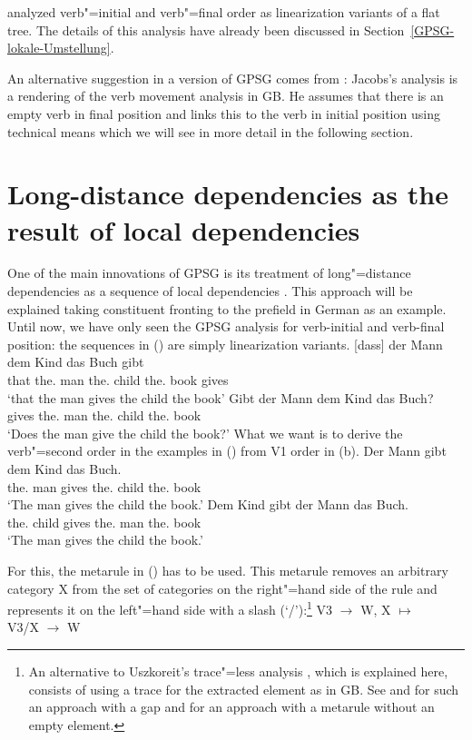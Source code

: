 \mbox{}\citet{Uszkoreit87a} analyzed verb"=initial and verb"=final order as linearization variants of a flat tree. The details of this analysis have already
been discussed in Section~\ref{GPSG-lokale-Umstellung}.

An alternative suggestion in a version of GPSG comes from \citet[]{Jacobs86a}: Jacobs's analysis is a rendering of the verb movement analysis in GB. He assumes that there
is an empty verb in final position and links this to the verb in initial position using technical
means which we will see in more detail in the following section.

\section{Long-distance dependencies as the result of local dependencies}
\label{Abschnitt-GPSG-Fernabhaengigkeiten}\label{sec-nld-gpsg}

One of the main innovations of GPSG is its treatment of long"=distance dependencies as a sequence of local dependencies \citep{Gazdar81a}.
This approach will be explained taking constituent fronting to the prefield in German as an
example. Until now, we have only seen the GPSG analysis for verb-initial and verb-final position: the
sequences in () are simply linearization variants.
\eal
\ex 
\gll {}[dass]         der        Mann dem        Kind das Buch gibt\\
     {}\spacebr{}that the.\NOM{} man  the.\DAT{} child the.\ACC{} book gives\\
\glt `that the man gives the child the book'
\ex 
\gll Gibt der Mann dem Kind das Buch?\\
	 gives the.\NOM{} man the.\DAT{} child the.\ACC{} book\\
\glt `Does the man give the child the book?'
\zl
What we want is to derive the verb"=second order in the examples in () from V1 order in (b).
\eal
\ex 
\gll Der Mann gibt dem Kind das Buch.\\
     the.\NOM{} man  gives the.\DAT{} child the.\ACC{} book\\
\glt `The man gives the child the book.'
\ex 
\gll Dem Kind gibt der Mann das Buch.\\
     the.\DAT{} child gives the.\NOM{} man the.\ACC{} book\\
\glt `The man gives the child the book.'
\zl

\noindent
For this, the metarule in () has to be used. This metarule removes an arbitrary category X from the set of categories on the right"=hand side of the rule and represents it on
the left"=hand side with a slash (`/')\is{/}:\footnote{%
	An alternative to Uszkoreit's trace"=less analysis \citeyearpar[]{Uszkoreit87a},
        which is explained here, consists of using a trace
	for the extracted element as in GB. See \citet[179]{Gazdar81a} and \citet[143--144]{GKPS85a} for such an approach with a gap
        and \citet*[85]{GKPS84a-u} for an approach with a metarule without an empty element.
}
\ea
\label{meta-slash-intro}
V3  $\to$ W, X $\mapsto$\\
V3/X  $\to$ W
\z

